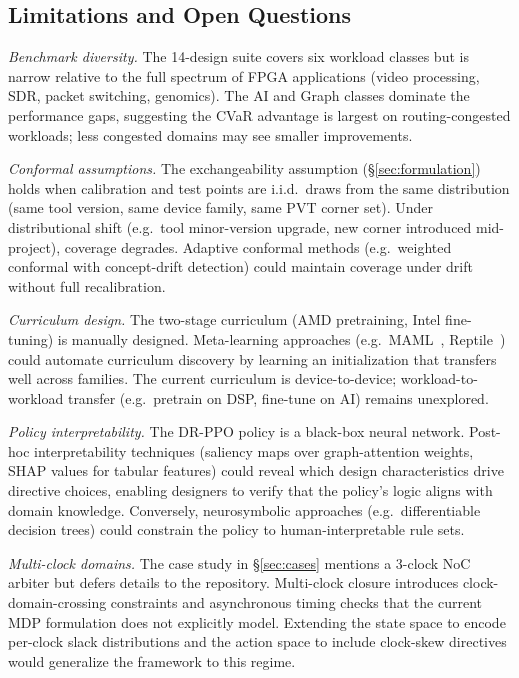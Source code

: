 \documentclass[journal,onecolumn=false]{IEEEtran}
\begin{document}
\subsection{Limitations and Open Questions}

\emph{Benchmark diversity.} The 14-design suite covers six workload classes but is narrow relative to the full spectrum of FPGA applications (video processing, SDR, packet switching, genomics). The AI and Graph classes dominate the performance gaps, suggesting the CVaR advantage is largest on routing-congested workloads; less congested domains may see smaller improvements.

\emph{Conformal assumptions.} The exchangeability assumption (\S\ref{sec:formulation}) holds when calibration and test points are i.i.d.\ draws from the same distribution (same tool version, same device family, same PVT corner set). Under distributional shift (e.g.\ tool minor-version upgrade, new corner introduced mid-project), coverage degrades. Adaptive conformal methods (e.g.\ weighted conformal with concept-drift detection) could maintain coverage under drift without full recalibration.

\emph{Curriculum design.} The two-stage curriculum (AMD pretraining, Intel fine-tuning) is manually designed. Meta-learning approaches (e.g.\ MAML~\cite{finn2017maml}, Reptile~\cite{nichol2018reptile}) could automate curriculum discovery by learning an initialization that transfers well across families. The current curriculum is device-to-device; workload-to-workload transfer (e.g.\ pretrain on DSP, fine-tune on AI) remains unexplored.

\emph{Policy interpretability.} The DR-PPO policy is a black-box neural network. Post-hoc interpretability techniques (saliency maps over graph-attention weights, SHAP values for tabular features) could reveal which design characteristics drive directive choices, enabling designers to verify that the policy's logic aligns with domain knowledge. Conversely, neurosymbolic approaches (e.g.\ differentiable decision trees) could constrain the policy to human-interpretable rule sets.

\emph{Multi-clock domains.} The case study in \S\ref{sec:cases} mentions a 3-clock NoC arbiter but defers details to the repository. Multi-clock closure introduces clock-domain-crossing constraints and asynchronous timing checks that the current MDP formulation does not explicitly model. Extending the state space to encode per-clock slack distributions and the action space to include clock-skew directives would generalize the framework to this regime.
\end{document}
